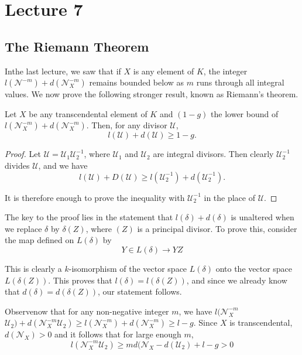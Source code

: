 \chapter{Lecture 7}\label{chap7}

\setcounter{section}{11}
\section{The Riemann Theorem}\label{chap7:sec1}%

In\pageoriginale the last lecture, we saw that if $X$ is any element of $K$, the
integer $l(\mathscr{N}^{-m} )+ d(\mathscr{N}_X^{-m})$ remains bounded
below as $m$ runs through all integral values. We now prove the
following stronger result, known as Riemann's theorem. 
\begin{theorem*}%
  Let $X$ be any transcendental element of $K$ and $(1-g)$ the lower
  bound of $l(\mathscr{N}_X^{-m}) + d(\mathscr{N}_X^{-m})$. Then, for
  any divisor $\mathscr{U}$, 
  $$
  l(\mathscr{U}) + d(\mathscr{U}) \ge 1 - g.
  $$
\end{theorem*}

\begin{proof}
  Let $\mathscr{U} = \mathscr{U}_1 \mathscr{U}_2^{-1}$, where
  $\mathscr{U}_1$ and $\mathscr{U}_2$ are integral divisors. Then
  clearly $\mathscr{U}_2^{-1}$ divides $\mathscr{U}$, and we have 
  $$
  l(\mathscr{U}) + D(\mathscr{U}) \ge l(\mathscr{U}_2^{-1}) +
  d(\mathscr{U}_2^{-1}) . 
  $$

  It is therefore enough to prove the inequality with
  $\mathscr{U}_2^{-1}$ in the place of $\mathscr{U}$. 
\end{proof}

The key to the proof lies in the statement that $l(\delta) +
d(\delta)$ is unaltered when we replace $\delta$ by $\delta(Z)$, where
$(Z)$ is a principal divisor. To prove this, consider the map defined
on $L(\delta)$ by  
$$
Y \in L (\delta) \to YZ
$$

This is clearly a $k$-isomorphism of the vector space $L(\delta)$ onto
the vector space $L(\delta(Z))$. This proves that $l(\delta) =
l(\delta(Z))$, and since we already know that $d(\delta) =
d(\delta(Z))$, our statement follows. 

Observe\pageoriginale now that for any non-negative integer $m$, we have
$l(\mathscr{N}_X^{-m}$ $\mathscr{U}_2) + d(\mathscr{N}_X^{-m}
\mathscr{U}_2) \ge l(\mathscr{N}_X^{-m}) +d(\mathscr{N}_X^{-m}) \ge
l-g$. Since $X$ is transcendental, $d(\mathscr{N}_X) > 0$ and it
follows that for large enough $m$, 
$$
l(\mathscr{N}_X^{-m} \mathscr{U}_2) \geq m d(\mathscr{N}_X  -
d(\mathscr{U}_2) +  l-g > 0 
$$

